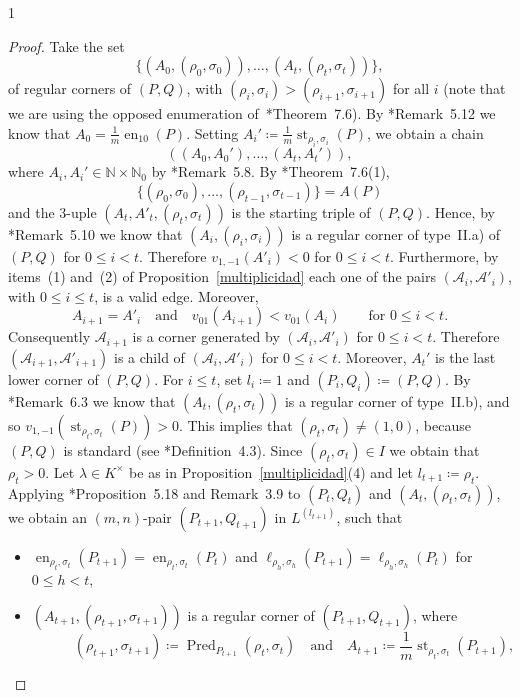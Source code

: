 \documentclass[reqno,a4paper,twoside]{amsart}
\theoremstyle{definition}
\theoremstyle{remark}
\DeclareMathOperator{\en}{en}
\DeclareMathOperator{\st}{st}
\DeclareMathOperator{\Pred}{Pred}
\begin{document}
\begin{spacing}{1}
\begin{proof}
Take the set
$$
\{(A_0,(\rho_0,\sigma_0)),\dots,(A_t,(\rho_t,\sigma_t))\},
$$
of regular corners of $(P,Q)$, with $(\rho_i,\sigma_i)>(\rho_{i+1},\sigma_{i+1})$ for all $i$ (note that we are using the opposed enumeration of~\cite{GGV1}*{Theorem~7.6}). By \cite{GGV1}*{Remark~5.12} we know that $A_0=\frac{1}{m}\en_{10}(P)$. Setting $A_i'\coloneqq \frac 1m \st_{\rho_i,\sigma_i}(P)$, we obtain a chain
$$
((A_0,A_0'),\dots,(A_t,A_t')),
$$
where $A_i,A_i'\in \mathds{N}\times\mathds{N}_0$ by \cite{GGV1}*{Remark~5.8}. By \cite{GGV1}*{Theorem~7.6(1)},
$$
\{(\rho_0,\sigma_0),\dots,(\rho_{t-1},\sigma_{t-1})\} = A(P)
$$
and the $3$-uple $(A_t,A'_t, (\rho_t,\sigma_t))$ is the starting triple of $(P,Q)$. Hence, by \cite{GGV1}*{Remark~5.10} we know that $(A_i,(\rho_i,\sigma_i))$ is a regular corner of type~II.a) of $(P,Q)$ for $0\le i<t$. Therefore $v_{1,-1}(A'_i)<0$ for $0\le i<t$. Furthermore, by items~(1) and~(2) of Proposition~\ref{multiplicidad} each one of the pairs $(\mathcal{A}_i,\mathcal{A}'_i)$, with $0\le i\le t$, is a valid edge. Moreover,
$$
A_{i+1} = A'_i\quad\text{and}\quad v_{01}(A_{i+1})<v_{01}(A_i)\qquad\text{for $0\le i<t$.}
$$
Consequently $\mathcal{A}_{i+1}$ is a corner generated by $(\mathcal{A}_i,\mathcal{A}'_i)$ for $0\le i <t$. Therefore $(\mathcal{A}_{i+1},\mathcal{A}'_{i+1})$ is a child of $(\mathcal{A}_i,\mathcal{A}'_i)$ for $0\le i <t$. Moreover, $A_t'$ is the last lower corner of $(P,Q)$. For $i\le t$, set $l_i\coloneqq 1$ and $(P_i,Q_i)\coloneqq (P,Q)$. By \cite{GGV1}*{Remark~6.3} we know that $(A_t,(\rho_t,\sigma_t))$ is a regular corner of type~II.b), and so $v_{1,-1}(\st_{\rho_t,\sigma_t}(P))>0$. This implies that $(\rho_t,\sigma_t)\ne (1,0)$, because $(P,Q)$ is standard (see \cite{GGV1}*{Definition~4.3}). Since $(\rho_t,\sigma_t)\in I$ we obtain that $\rho_t>0$. Let $\lambda\in K^{\times}$ be as in Proposition~\ref{multiplicidad}(4) and let \hbox{$l_{t+1}\coloneqq \rho_t$}. Applying \cite{GGV1}*{Proposition~5.18 and Remark~3.9} to $(P_t,Q_t)$ and $(A_t,(\rho_t,\sigma_t))$, we obtain an $(m,n)$-pair $(P_{t+1},Q_{t+1})$ in $L^{(l_{t+1})}$, such that

\begin{itemize}[itemsep=0.5675ex,topsep=0.5675ex]

\item[-] $\en_{\rho_t,\sigma_t}(P_{t+1}) = \en_{\rho_t,\sigma_t}(P_t)$ and $\ell_{\rho_h,\sigma_h}(P_{t+1}) = \ell_{\rho_h,\sigma_h}(P_t)$ for $0\le h < t$,

\item[-] $(A_{t+1},(\rho_{t+1},\sigma_{t+1}))$ is a regular corner of $(P_{t+1},Q_{t+1})$, where
$$
\qquad\quad (\rho_{t+1},\sigma_{t+1})\coloneqq \Pred_{P_{t+1}}(\rho_t,\sigma_t)\quad\text{and}\quad A_{t+1}\coloneqq \frac{1}{m}\st_{\rho_t,\sigma_t}(P_{t+1}),
$$


\end{itemize}
\end{proof}
\end{spacing}
\end{document}

